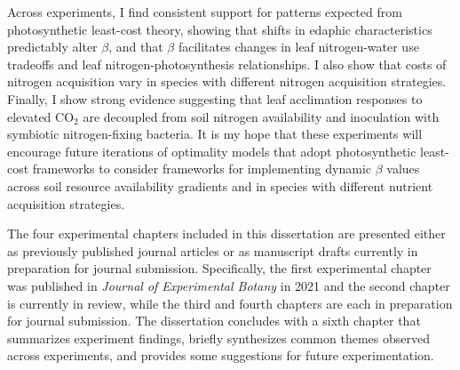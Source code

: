 Across experiments, I find consistent support for patterns expected from photosynthetic least-cost theory, showing that shifts in edaphic characteristics predictably alter $\beta$, and that $\beta$ facilitates changes in leaf nitrogen-water use tradeoffs and leaf nitrogen-photosynthesis relationships. I also show that costs of nitrogen acquisition vary in species with different nitrogen acquisition strategies. Finally, I show strong evidence suggesting that leaf acclimation responses to elevated CO$_2$ are decoupled from soil nitrogen availability and inoculation with symbiotic nitrogen-fixing bacteria. It is my hope that these experiments will encourage future iterations of optimality models that adopt photosynthetic least-cost frameworks to consider frameworks for implementing dynamic $\beta$ values across soil resource availability gradients and in species with different nutrient acquisition strategies.

The four experimental chapters included in this dissertation are presented either as previously published journal articles or as manuscript drafts currently in preparation for journal submission. Specifically, the first experimental chapter was published in \textit{Journal of Experimental Botany} in 2021 and the second chapter is currently in review, while the third and fourth chapters are each in preparation for journal submission. The dissertation concludes with a sixth chapter that summarizes experiment findings, briefly synthesizes common themes observed across experiments, and provides some suggestions for future experimentation.